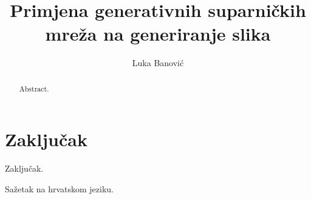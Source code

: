 \documentclass[times, utf8, diplomski]{fer}
\newcommand\todo[1]{\textcolor{red}{#1}}
\begin{document}
\thesisnumber{\todo{thesis number}}

\title{Primjena generativnih suparničkih mreža na generiranje slika}

\author{Luka Banović}

\maketitle

\izvornik

\zahvala{}

\tableofcontents













\chapter{Zaključak}
Zaključak.




\begin{sazetak}
Sažetak na hrvatskom jeziku.

\end{sazetak}

\begin{abstract}
Abstract.

\end{abstract}
\end{document}
